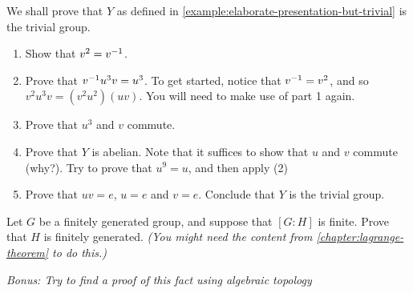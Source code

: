 \documentclass[./main.tex]{subfiles}
\begin{document}
\begin{exercise}
\label{ex:elaborate-presentation-but-trivial}
    We shall prove that $Y$ as defined in \cref{example:elaborate-presentation-but-trivial} is the trivial group.
    \begin{enumerate}
        \item Show that $v^2 = v^{-1}$.
        \item Prove that $v^{-1} u^3 v = u^3$. To get started, notice that $v^{-1}
        = v^2$, and so $v^2 u^3 v = (v^2 u^2) (uv)$. You will need to make use of part 1 again.
        \item Prove that $u^3$ and $v$ commute.
        \item Prove that $Y$ is abelian. Note that it suffices to show that $u$
        and $v$ commute (why?). Try to prove that $u^9 = u$, and then apply (2)
        \item Prove that $uv=e$, $u=e$ and $v=e$. Conclude that $Y$ is the
        trivial group.
    \end{enumerate}
\end{exercise}

\begin{prob}    
    Let $G$ be a finitely generated group, and suppose that $[G:H]$ is finite.
    Prove that $H$ is finitely generated. \textit{(You might need the content
    from \cref{chapter:lagrange-theorem} to do this.)}

    \textit{Bonus: Try to find a proof of this fact using algebraic topology}
\end{prob}
\end{document}
